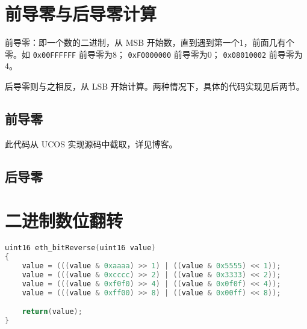 \section{前导零与后导零计算}

前导零：即一个数的二进制，从 MSB 开始数，直到遇到第一个1，前面几有个零。如 \lstinline{0x00FFFFFF} 前导零为8； \lstinline{0xF0000000} 前导零为0； \lstinline{0x08010002} 前导零为4。

后导零则与之相反，从 LSB 开始计算。两种情况下，具体的代码实现见后两节。

\subsection{前导零}

此代码从 UCOS 实现源码中截取，详见博客\cite{65TiaoXiaoXiJiSuanQianDaoLingCYuYanShiXianU013073067DeBoKeCSDNBoKe}。


\subsection{后导零}



\section{二进制数位翻转}

\begin{lstlisting}[language=C,style=C]
uint16 eth_bitReverse(uint16 value)
{
    value = (((value & 0xaaaa) >> 1) | ((value & 0x5555) << 1));
    value = (((value & 0xcccc) >> 2) | ((value & 0x3333) << 2));
    value = (((value & 0xf0f0) >> 4) | ((value & 0x0f0f) << 4));
    value = (((value & 0xff00) >> 8) | ((value & 0x00ff) << 8));

    return(value);
}
\end{lstlisting}
